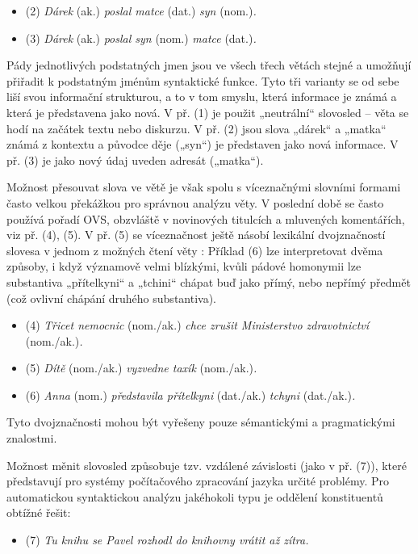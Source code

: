 \begin{multicols}{2}
\begin{itemize}
\item[] (2)	\textit{Dárek} (ak.) \textit{poslal matce} (dat.) \textit{syn} (nom.)\textit{.}
\item[] (3)	\textit{Dárek} (ak.) \textit{poslal syn} (nom.) \textit{matce} (dat.)\textit{.}
\end{itemize}
Pády jednotlivých podstatných jmen jsou ve všech třech větách stejné a umožňují přiřadit k podstatným jménům syntaktické funkce. Tyto tři varianty se od sebe liší svou informační strukturou, a to v tom smyslu, která informace je známá a která je představena jako nová. V př. (1) je použit „neutrální“ slovosled – věta se hodí na začátek textu nebo diskurzu. V př. (2) jsou slova „dárek“ a „matka“ známá z kontextu a původce děje („syn“) je představen jako nová informace. V př. (3) je jako nový údaj uveden adresát („matka“).

Možnost přesouvat slova ve větě je však spolu s víceznačnými slovními formami často velkou překážkou pro správnou analýzu věty. V poslední době se často používá pořadí OVS, obzvláště v novinových titulcích a mluvených komentářích, viz př. (4), (5). V př. (5) se víceznačnost ještě násobí lexikální dvojznačností slovesa v jednom z možných čtení věty \cite{Note4}: Příklad (6) lze interpretovat dvěma způsoby, i když významově velmi blízkými, kvůli pádové homonymii lze substantiva „přítelkyni“ a „tchini“ chápat buď jako přímý, nebo nepřímý předmět (což ovlivní chápání druhého substantiva).
\begin{itemize}
\item[] (4)	\textit{Třicet nemocnic} (nom./ak.) \textit{chce zrušit Ministerstvo zdravotnictví} (nom./ak.)\textit{.}
\item[] (5)	\textit{Dítě} (nom./ak.) \textit{vyzvedne taxík} (nom./ak.)\textit{.}
\item[] (6)	\textit{Anna} (nom.) \textit{představila přítelkyni} (dat./ak.) \textit{tchyni} (dat./ak.)\textit{.}
\end{itemize}
Tyto dvojznačnosti mohou být vyřešeny pouze sémantickými a pragmatickými znalostmi.

Možnost měnit slovosled způsobuje tzv. vzdálené závislosti (jako v př. (7)), které představují pro systémy počítačového zpracování jazyka určité problémy. Pro automatickou syntaktickou analýzu jakéhokoli typu je oddělení konstituentů obtížné řešit:
\begin{itemize}
\item[] (7)	\textit{Tu knihu se Pavel rozhodl do knihovny vrátit až zítra.}
\end{itemize}


\end{multicols}
